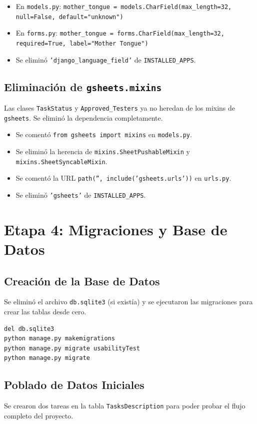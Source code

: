 \documentclass[12pt, spanish]{article}
\begin{document}
\begin{itemize}[label=--]
    \item En \texttt{models.py}: \texttt{mother\_tongue = models.CharField(max\_length=32, null=False, default="unknown")}
    \item En \texttt{forms.py}: \texttt{mother\_tongue = forms.CharField(max\_length=32, required=True, label="Mother Tongue")}
    \item Se eliminó \texttt{'django\_language\_field'} de \texttt{INSTALLED\_APPS}.
\end{itemize}

\subsection{Eliminación de \texttt{gsheets.mixins}}
Las clases \texttt{TaskStatus} y \texttt{Approved\_Testers} ya no heredan de los mixins de \texttt{gsheets}. Se eliminó la dependencia completamente.

\begin{itemize}[label=--]
    \item Se comentó \texttt{from gsheets import mixins} en \texttt{models.py}.
    \item Se eliminó la herencia de \texttt{mixins.SheetPushableMixin} y \texttt{mixins.SheetSyncableMixin}.
    \item Se comentó la URL \texttt{path('', include('gsheets.urls'))} en \texttt{urls.py}.
    \item Se eliminó \texttt{'gsheets'} de \texttt{INSTALLED\_APPS}.
\end{itemize}

\section{Etapa 4: Migraciones y Base de Datos}
\subsection{Creación de la Base de Datos}
Se eliminó el archivo \texttt{db.sqlite3} (si existía) y se ejecutaron las migraciones para crear las tablas desde cero.

\begin{lstlisting}[language=bash, caption={Comandos para migrar la base de datos}]
del db.sqlite3
python manage.py makemigrations
python manage.py migrate usabilityTest
python manage.py migrate
\end{lstlisting}

\subsection{Poblado de Datos Iniciales}
Se crearon dos tareas en la tabla \texttt{TasksDescription} para poder probar el flujo completo del proyecto.
\end{document}
